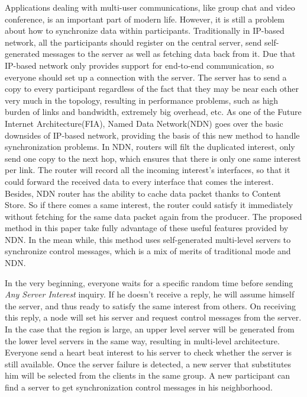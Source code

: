 \documentclass[conference]{IEEEtran}
\begin{document}
Applications dealing with multi-user communications,
like group chat and video conference,
is an important part of modern life.
However, it is still a problem about how to synchronize data within participants.
Traditionally in IP-based network,
all the participants should register on the central server,
send self-generated messages to the server as well as fetching data back from it.
Due that IP-based network only provides support for end-to-end communication,
so everyone should set up a connection with the server.
The server has to send a copy to every participant regardless of the fact that
they may be near each other very much in the topology,
resulting in performance problems, such as high burden of links and bandwidth,
extremely big overhead, etc.
As one of the Future Internet Architecture(FIA)\cite{FIA},
Named Data Network(NDN)\cite{NDN001} goes over the basic downsides of IP-based network,
providing the basis of this new method to handle synchronization problems.
In NDN, routers will filt the duplicated interest,
only send one copy to the next hop,
which ensures that there is only one same interest per link.
The router will record all the incoming interest's interfaces,
so that it could forward the received data to every interface that comes the interest.
Besides, NDN router has the ability to cache data packet thanks to Content Store.
So if there comes a same interest,
the router could satisfy it immediately without fetching for the same data packet again from the producer.
The proposed method in this paper take fully advantage of these useful features provided by NDN.
In the mean while,
this method uses self-generated multi-level servers to synchronize control messages,
which is a mix of merits of traditional mode and NDN.

In the very beginning,
everyone waits for a specific random time before sending \emph{Any Server Interest} inquiry.
If he doesn't receive a reply, he will assume himself the server,
and thus ready to satisfy the same interest from others.
On receiving this reply, a node will set his server and request control messages from the server.
In the case that the region is large,
an upper level server will be generated from the lower level servers in the same way,
resulting in multi-level architecture.
Everyone send a heart beat interest to his server to check whether the server is still available.
Once the server failure is detected,
a new server that substitutes him will be selected from the clients in the same group.
A new participant can find a server to get synchronization control messages in his neighborhood.
\end{document}
